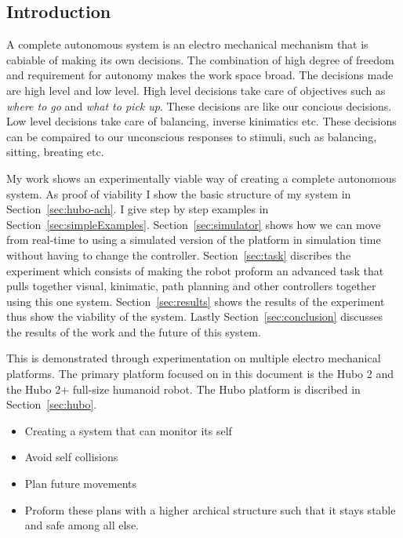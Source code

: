 \subsection{Introduction}

A complete autonomous system is an electro mechanical mechanism that is cabiable of making its own decisions.
The combination of high degree of freedom and requirement for autonomy makes the work space broad.
The decisions made are high level and low level.
High level decisions take care of objectives such as \textit{where to go} and \textit{what to pick up}. 
These decisions are like our concious decisions.
Low level decisions take care of balancing, inverse kinimatics etc.
These decisions can be compaired to our unconscious responses to stimuli, such as balancing, sitting, breating etc.

My work shows an experimentally viable way of creating a complete autonomous system.  
As proof of viability I show the basic structure of my system in Section~\ref{sec:hubo-ach}.  
I give step by step examples in Section~\ref{sec:simpleExamples}.
Section~\ref{sec:simulator} shows how we can move from real-time to using a simulated version of the platform in simulation time without having to change the controller.
Section~\ref{sec:task} discribes the experiment which consists of making the robot proform an advanced task that pulls together visual, kinimatic, path planning and other controllers together using this one system.
Section~\ref{sec:results} shows the results of the experiment thus show the viability of the system.
Lastly Section~\ref{sec:conclusion} discusses the results of the work and the future of this system.


This is demonstrated through experimentation on multiple electro mechanical platforms.
The primary platform focused on in this document is the Hubo 2 and the Hubo 2+ full-size humanoid robot.
The Hubo platform is discribed in Section~\ref{sec:hubo}.




\begin{itemize}
\item Creating a system that can monitor its self
\item Avoid self collisions
\item Plan future movements
\item Proform these plans with a higher archical structure such that it stays stable and safe among all else.
\end{itemize}
